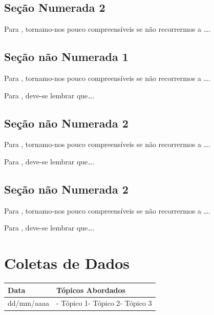 \documentclass[
]{book}
\begin{document}
\hypertarget{seuxe7uxe3o-numerada-2-12}{%
\subsection{Seção Numerada 2}\label{seuxe7uxe3o-numerada-2-12}}

Para \citet{BOCK2001}, tornamo-nos pouco compreensíveis se não recorrermos a \ldots.

\hypertarget{seuxe7uxe3o-nuxe3o-numerada-1-25}{%
\subsection*{Seção não Numerada 1}\label{seuxe7uxe3o-nuxe3o-numerada-1-25}}

Para \citet{BOCK2001}, tornamo-nos pouco compreensíveis se não recorrermos a \ldots.

Para \citet{DAVIDOFF2001}, deve-se lembrar que\ldots.

\hypertarget{seuxe7uxe3o-nuxe3o-numerada-2-37}{%
\subsection*{Seção não Numerada 2}\label{seuxe7uxe3o-nuxe3o-numerada-2-37}}

Para \citet{BOCK2001}, tornamo-nos pouco compreensíveis se não recorrermos a \ldots.

Para \citet{DAVIDOFF2001}, deve-se lembrar que\ldots.

\hypertarget{seuxe7uxe3o-nuxe3o-numerada-2-38}{%
\subsection*{Seção não Numerada 2}\label{seuxe7uxe3o-nuxe3o-numerada-2-38}}

Para \citet{BOCK2001}, tornamo-nos pouco compreensíveis se não recorrermos a \ldots.

Para \citet{DAVIDOFF2001}, deve-se lembrar que\ldots.

\hypertarget{coletas-de-dados}{%
\section{Coletas de Dados}\label{coletas-de-dados}}

\begin{longtable}[]{@{}ll@{}}
\toprule()
Data & Tópicos Abordados \\
\midrule()
\endhead
dd/mm/aaaa & - Tópico 1- Tópico 2- Tópico 3 \\
\bottomrule()
\end{longtable}
\end{document}
